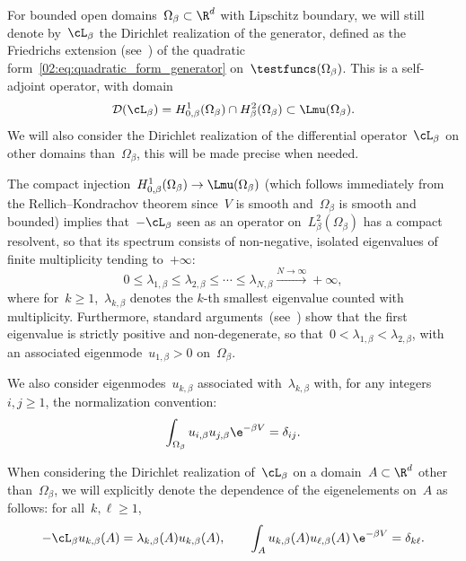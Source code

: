     For bounded open domains~$\Omega_\beta\subset\R^d$ with Lipschitz boundary, we will still denote by~$\cL_\beta$ the Dirichlet realization of the generator, defined as the Friedrichs extension (see~\cite{RS75}) of the quadratic form~\eqref{02:eq:quadratic_form_generator} on~$\testfuncs(\Omega_\beta)$.
    This is a self-adjoint operator, with domain~$$\mathcal D(\cL_\beta)={H_{0,\beta}^1(\Omega_\beta)\cap H^2_{\beta}(\Omega_\beta) \subset \Lmu(\Omega_\beta)}.$$
    We will also consider the Dirichlet realization of the differential operator~$\cL_\beta$ on other domains than~$\Omega_\beta$, this will be made precise when needed.
    
    The compact injection~$H_{0,\beta}^1(\Omega_\beta)\to \Lmu(\Omega_\beta)$ (which follows immediately from the Rellich--Kondrachov theorem since~$V$ is smooth and~$\Omega_\beta$ is smooth and bounded) implies that~$-\cL_\beta$ seen as an operator on~$L^2_\beta(\Omega_\beta)$ has a compact resolvent, so that its spectrum consists of non-negative, isolated eigenvalues of finite multiplicity tending to~$+\infty$:
   ~$$0\leq\lambda_{1,\beta} \leq \lambda_{2,\beta}\leq \dotsm \leq\lambda_{N,\beta} \xrightarrow{N\to\infty}+\infty,$$
   where for~$k\geq 1$,~$\lambda_{k,\beta}$ denotes the $k$-th smallest eigenvalue counted with multiplicity.
    Furthermore, standard arguments~(see~\cite{LBLLP12}) show that the first eigenvalue is strictly positive and non-degenerate, so that~$0<\lambda_{1,\beta} < \lambda_{2,\beta}$, with an associated eigenmode~$u_{1,\beta} > 0$ on~$\Omega_\beta$.
    
    We also consider eigenmodes~$u_{k,\beta}$ associated with~$\lambda_{k,\beta}$ with, for any integers~$i,j\geq 1$, the normalization convention:
    \begin{equation}
        \label{02:eq:eigfunc_normalization}
        \int_{\Omega_\beta}u_{i,\beta}u_{j,\beta} \e^{-\beta V} = \delta_{ij}.
    \end{equation}

    When considering the Dirichlet realization of~$\cL_\beta$ on a domain~$A\subset\R^d$ other than~$\Omega_\beta$, we will explicitly denote the dependence of the eigenelements on~$A$ as follows: for all~$k,\ell\geq 1$,
    \begin{equation}
        \label{02:eq:eigenpairs_alt_domain}
        -\cL_\beta u_{k,\beta}(A) = \lambda_{k,\beta}(A)u_{k,\beta}(A),\qquad \int_A u_{k,\beta}(A)u_{\ell,\beta}(A)\,\e^{-\beta V}=\delta_{k\ell}.
    \end{equation}
